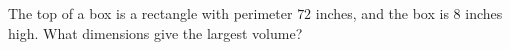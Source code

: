 The top of a box is a rectangle with perimeter $72$ inches, and the box is $8$ inches high. What dimensions give the largest volume?
